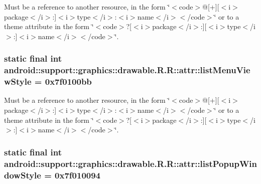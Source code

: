 Must be a reference to another resource, in the form \char`\"{}$<$code$>$@\mbox{[}+\mbox{]}\mbox{[}$<$i$>$package$<$/i$>$:\mbox{]}$<$i$>$type$<$/i$>$:$<$i$>$name$<$/i$>$$<$/code$>$\char`\"{} or to a theme attribute in the form \char`\"{}$<$code$>$?\mbox{[}$<$i$>$package$<$/i$>$:\mbox{]}\mbox{[}$<$i$>$type$<$/i$>$:\mbox{]}$<$i$>$name$<$/i$>$$<$/code$>$\char`\"{}. \hypertarget{classandroid_1_1support_1_1graphics_1_1drawable_1_1_r_1_1attr_1b05baff6c902ad44ecb49595c2ac79e}{
\subsubsection[{listMenuViewStyle}]{\setlength{\rightskip}{0pt plus 5cm}static final int android::support::graphics::drawable.R.R::attr::listMenuViewStyle = 0x7f0100bb}}
\label{classandroid_1_1support_1_1graphics_1_1drawable_1_1_r_1_1attr_1b05baff6c902ad44ecb49595c2ac79e}


Must be a reference to another resource, in the form \char`\"{}$<$code$>$@\mbox{[}+\mbox{]}\mbox{[}$<$i$>$package$<$/i$>$:\mbox{]}$<$i$>$type$<$/i$>$:$<$i$>$name$<$/i$>$$<$/code$>$\char`\"{} or to a theme attribute in the form \char`\"{}$<$code$>$?\mbox{[}$<$i$>$package$<$/i$>$:\mbox{]}\mbox{[}$<$i$>$type$<$/i$>$:\mbox{]}$<$i$>$name$<$/i$>$$<$/code$>$\char`\"{}. \hypertarget{classandroid_1_1support_1_1graphics_1_1drawable_1_1_r_1_1attr_e660de6762e0889d330bdc15f1c2e345}{
\subsubsection[{listPopupWindowStyle}]{\setlength{\rightskip}{0pt plus 5cm}static final int android::support::graphics::drawable.R.R::attr::listPopupWindowStyle = 0x7f010094}}
\label{classandroid_1_1support_1_1graphics_1_1drawable_1_1_r_1_1attr_e660de6762e0889d330bdc15f1c2e345}


